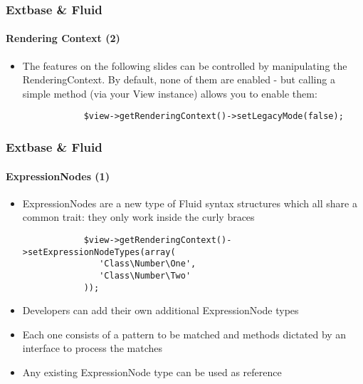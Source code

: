\begin{frame}[fragile]
	\frametitle{Extbase \& Fluid}
	\framesubtitle{Rendering Context (2)}

	\lstset{basicstyle=\smaller\ttfamily}

	\begin{itemize}

		\item The features on the following slides can be controlled by manipulating
			the RenderingContext. By default, none of them are enabled - but calling
			a simple method (via your View instance) allows you to enable them:

		\begin{lstlisting}
			$view->getRenderingContext()->setLegacyMode(false);
		\end{lstlisting}

	\end{itemize}

\end{frame}


\begin{frame}[fragile]
	\frametitle{Extbase \& Fluid}
	\framesubtitle{ExpressionNodes (1)}

	\lstset{basicstyle=\smaller\ttfamily}

	\begin{itemize}

		\item ExpressionNodes are a new type of Fluid syntax structures which all
			share a common trait: they only work inside the curly braces

		\begin{lstlisting}
			$view->getRenderingContext()->setExpressionNodeTypes(array(
			   'Class\Number\One',
			   'Class\Number\Two'
			));
		\end{lstlisting}

		\item Developers can add their own additional ExpressionNode types

		\item Each one consists of a pattern to be matched and methods dictated
			by an interface to process the matches

		\item Any existing ExpressionNode type can be used as reference

	\end{itemize}

\end{frame}

